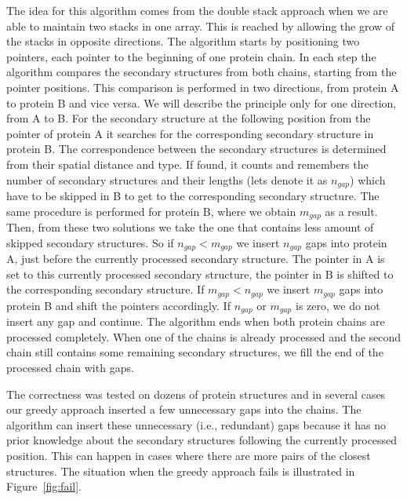 \documentclass[twocolumn]{bmcart}%
\begin{document}
The idea for this algorithm comes from the double stack approach when we are able to maintain two stacks in one array.
This is reached by allowing the grow of the stacks in opposite directions.
The algorithm starts by positioning two pointers, each pointer to the beginning of one protein chain.
In each step the algorithm compares the secondary structures from both chains, starting from the pointer positions.
This comparison is performed in two directions, from protein A to protein B and vice versa.
We will describe the principle only for one direction, from A to B.
For the secondary structure at the following position from the pointer of protein A it searches for the corresponding secondary structure in protein B.
The correspondence between the secondary structures is determined from their spatial distance and type.
If found, it counts and remembers the number of secondary structures and their lengths (lets denote it as $n_{gap}$) which have to be skipped in B to get to the corresponding secondary structure.
The same procedure is performed for protein B, where we obtain $m_{gap}$ as a result.
Then, from these two solutions we take the one that contains less amount of skipped secondary structures.
So if $n_{gap} < m_{gap}$ we insert $n_{gap}$ gaps into protein A, just before the currently processed secondary structure.
The pointer in A is set to this currently processed secondary structure, the pointer in B is shifted to the corresponding secondary structure.
If $m_{gap} < n_{gap}$ we insert $m_{gap}$ gaps into protein B and shift the pointers accordingly.
If $n_{gap}$ or $m_{gap}$ is zero, we do not insert any gap and continue.
The algorithm ends when both protein chains are processed completely.
When one of the chains is already processed and the second chain still contains some remaining secondary structures, we fill the end of the processed chain with gaps.

The correctness was tested on dozens of protein structures and in several cases our greedy approach inserted a few unnecessary gaps into the chains.
The algorithm can insert these unnecessary (i.e., redundant) gaps because it has no prior knowledge about the secondary structures following the currently processed position.
This can happen in cases where there are more pairs of the closest structures.
The situation when the greedy approach fails is illustrated in Figure~\ref{fig:fail}.
\end{document}
